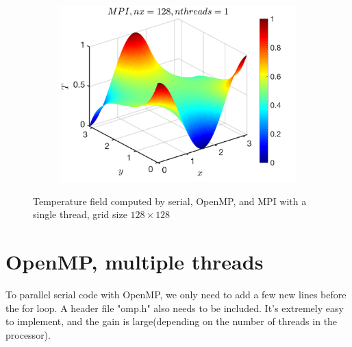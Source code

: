 \documentclass[a4paper]{article}
\begin{document}
\begin{figure}[H]
\begin{subfigure}[b]{0.32\textwidth}
        \end{subfigure}
        \
                \begin{subfigure}[b]{0.32\textwidth}   
            \centering 
            \includegraphics[width=\textwidth]{./Figure/heat_mpi_nx128_nth1.png} 
        \end{subfigure}
        \caption{Temperature field computed by serial, OpenMP, and MPI with a single thread, grid size $128\times128$}
    \end{figure}
    
    \section{OpenMP, multiple threads}
    To parallel serial code with OpenMP, we only need to add a few new lines before the for loop. A header file "omp.h" also needs to be included. It's extremely easy to implement, and the gain is large(depending on the number of threads in the processor).
    
\end{document}
